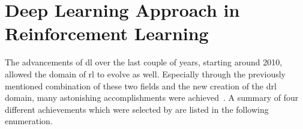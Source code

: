 \documentclass[draft,final]{vutinfth} %
\newcommand{\p}[1]{see p. #1}
\begin{document}



    \section{Deep Learning Approach in Reinforcement Learning}
    The advancements of \gls{dl} over the last couple of years, starting around 2010, allowed the domain of \gls{rl} to evolve as well.
    Especially through the previously mentioned combination of these two fields and the new creation of the \gls{drl} domain, many astonishing accomplishments were achieved~\citep{francois-lavet_introduction_2018}.
    A summary of four different achievements which were selected by \citet[\p{374}]{aggarwal_neural_2018} are listed in the following enumeration.
\end{document}
